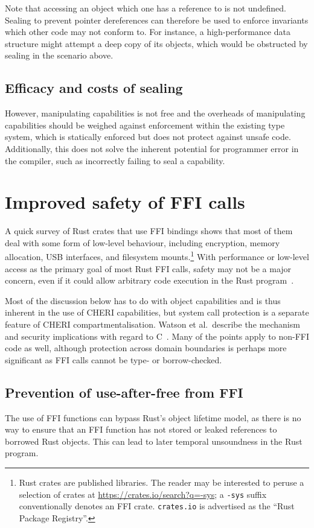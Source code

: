 \documentclass[dissertation.tex]{subfiles}
\begin{document}
Note that accessing an object which one has a reference to is not
undefined.
Sealing to prevent pointer dereferences can therefore be used to enforce
invariants which other code may not conform to.
For instance, a high-performance data structure might attempt a deep
copy of its objects, which would be obstructed by sealing in the
scenario above.


\subsection{Efficacy and costs of sealing}
However, manipulating capabilities is not free and the overheads of
manipulating capabilities should be weighed against enforcement within
the existing type system, which is statically enforced but does not
protect against unsafe code.
Additionally, this does not solve the inherent potential for programmer
error in the compiler, such as incorrectly failing to seal a capability.


\section{Improved safety of FFI calls}
\label{sec:eval-rust-xprocess}

A quick survey of Rust crates that use FFI bindings shows that most of
them deal with some form of low-level behaviour, including encryption,
memory allocation, USB interfaces, and filesystem mounts.\footnote{
    Rust crates are published libraries.
    The reader may be interested to peruse a selection of crates at
    \url{https://crates.io/search?q=-sys};
    a \texttt{-sys} suffix conventionally denotes an FFI crate.
    \texttt{crates.io} is advertised as the ``Rust Package Registry''.
}
With performance or low-level access as the primary goal of most Rust
FFI calls, safety may not be a major concern, even if it could allow
arbitrary code execution in the Rust
program~\cite{szekeres-eternal-war}.

Most of the discussion below has to do with object capabilities and is
thus inherent in the use of CHERI capabilities, but system call
protection is a separate feature of CHERI compartmentalisation.
Watson et al.\ describe the mechanism and security implications with
regard to C~\cite{cheri2015}.
Many of the points apply to non-FFI code as well, although protection
across domain boundaries is perhaps more significant as FFI calls cannot
be type- or borrow-checked.

\subsection{Prevention of use-after-free from FFI}
The use of FFI functions can bypass Rust's object lifetime model, as
there is no way to ensure that an FFI function has not stored or leaked
references to borrowed Rust objects.
This can lead to later temporal unsoundness in the Rust program.
\end{document}

